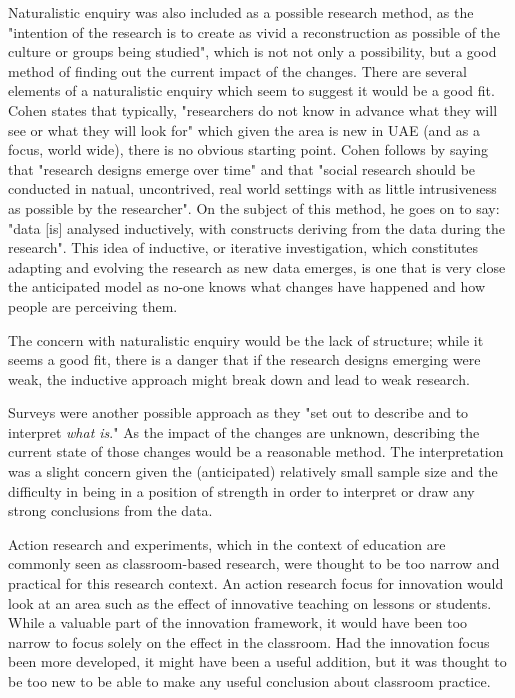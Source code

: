 Naturalistic enquiry was also included as a possible research method, as the "intention of the research is to create as vivid a reconstruction as possible of the culture or groups being studied", \cite{Cohen2005} which is not not only a possibility, but a good method of finding out the current impact of the changes. There are several elements of a naturalistic enquiry which seem to suggest it would be a good fit. Cohen states that typically, "researchers do not know in advance what they will see or what they will look for" \cite{Cohen2005} which given the area is new in UAE (and as a focus, world wide), there is no obvious starting point. Cohen follows by saying that "research designs emerge over time" and that "social research should be conducted in natual, uncontrived, real world settings with as little intrusiveness as possible by the researcher". On the subject of this method, he goes on to say: "data [is] analysed inductively, with constructs deriving from the data during the research". This idea of inductive, or iterative investigation, which constitutes adapting and evolving the research as new data emerges, is one that is very close the anticipated model as no-one knows what changes have happened and how people are perceiving them. 

The concern with naturalistic enquiry would be the lack of structure; while it seems a good fit, there is a danger that if the research designs emerging were weak, the inductive approach might break down and lead to weak research.

Surveys were another possible approach as they "set out to describe and to interpret \textit{what is}." \cite[p. 169]{Cohen2005} As the impact of the changes are unknown, describing the current state of those changes would be a reasonable method. The interpretation was a slight concern given the (anticipated) relatively small sample size and the difficulty in being in a position of strength in order to interpret or draw any strong conclusions from the data.

Action research and experiments, which in the context of education are commonly seen as classroom-based research, were thought to be too narrow and practical for this research context. An action research focus for innovation would look at an area such as the effect of innovative teaching on lessons or students. While a valuable part of the innovation framework, it would have been too narrow to focus solely on the effect in the classroom. Had the innovation focus been more developed, it might have been a useful addition, but it was thought to be too new to be able to make any useful conclusion about classroom practice.

